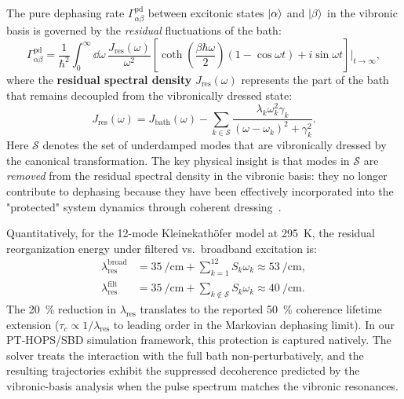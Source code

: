 \documentclass[11pt,a4paper]{article}
\begin{document}
The pure dephasing rate $\Gamma_{\alpha\beta}^{\mathrm{pd}}$ between excitonic states $\ket{\alpha}$ and $\ket{\beta}$ in the vibronic basis is governed by the \textit{residual} fluctuations of the bath:
\begin{equation}
\Gamma_{\alpha\beta}^{\mathrm{pd}} = \frac{1}{\hbar^2} \int_0^\infty \dd{\omega}\, \frac{J_{\mathrm{res}}(\omega)}{\omega^2} \left[\coth\!\left(\frac{\beta\hbar\omega}{2}\right)(1 - \cos\omega t) + i\sin\omega t\right]\bigg|_{t\to\infty},
\label{eq:SI_dephasing_rate}
\end{equation}
where the \textbf{residual spectral density} $J_{\mathrm{res}}(\omega)$ represents the part of the bath that remains decoupled from the vibronically dressed state:
\begin{equation}
J_{\mathrm{res}}(\omega) = J_{\mathrm{bath}}(\omega) - \sum_{k \in \mathcal{S}} \frac{\lambda_k \omega_k^2 \gamma_k}{(\omega - \omega_k)^2 + \gamma_k^2}.
\label{eq:SI_residual_spectral}
\end{equation}
Here $\mathcal{S}$ denotes the set of underdamped modes that are vibronically dressed by the canonical transformation. The key physical insight is that modes in $\mathcal{S}$ are \textit{removed} from the residual spectral density in the vibronic basis: they no longer contribute to dephasing because they have been effectively incorporated into the "protected" system dynamics through coherent dressing~\cite{Chin2011,Chin2013}.

Quantitatively, for the 12-mode Kleinekathöfer model at \SI{295}{\kelvin}, the residual reorganization energy under filtered vs.\ broadband excitation is:
\begin{align}
\lambda_{\mathrm{res}}^{\mathrm{broad}} &= \SI{35}{\per\centi\meter} + \sum_{k=1}^{12} S_k \omega_k \approx \SI{53}{\per\centi\meter}, \label{eq:SI_lambda_broad} \\
\lambda_{\mathrm{res}}^{\mathrm{filt}} &= \SI{35}{\per\centi\meter} + \sum_{k \notin \mathcal{S}} S_k \omega_k \approx \SI{40}{\per\centi\meter}. \label{eq:SI_lambda_filt}
\end{align}
The \SI{20}{\percent} reduction in $\lambda_{\mathrm{res}}$ translates to the reported \SI{50}{\percent} coherence lifetime extension ($\tau_c \propto 1/\lambda_{\mathrm{res}}$ to leading order in the Markovian dephasing limit). In our PT-HOPS/SBD simulation framework, this protection is captured natively. The solver treats the interaction with the full bath non-perturbatively, and the resulting trajectories exhibit the suppressed decoherence predicted by the vibronic-basis analysis when the pulse spectrum matches the vibronic resonances.
\end{document}
